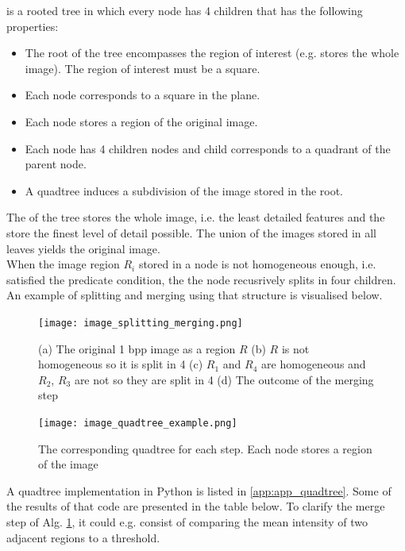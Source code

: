 \documentclass[a4paper]{article}
\begin{document}
 is a rooted tree in which every node has 4 children that has the following properties:
\begin{itemize}
    \item The root of the tree encompasses the region of interest (e.g. stores the whole image). The region of interest must be a square.
    \item Each node corresponds to a square in the plane.
    \item Each node stores a region of the original image.
    \item Each node has 4 children nodes and child corresponds to a quadrant of the parent node.
    \item A quadtree induces a subdivision of the image stored in the root.
\end{itemize}
The  of the tree stores the whole image, i.e. the least detailed features and the  store the finest level of detail possible. The union of the images stored in all leaves yields the original image.\\
When the image region $R_i$ stored in a node is not homogeneous enough, i.e. satisfied the predicate condition, the the node recusrively splits in four children. An example of splitting and merging using that structure is visualised below.

\begin{multicols}{2}
\begin{figure}[H]
    \label{alg:split_merge_high}
	\centering %
	\texttt{[image: image\_splitting\_merging.png]}
    \caption{ (a) The original 1 bpp image as a region $R$ (b) $R$ is not homogeneous so it is split in 4 (c) $R_1$ and $R_4$ are homogeneous and $R_2$, $R_3$ are not so they are split in 4 (d) The outcome of the merging step} 
\end{figure}
\columnbreak
\begin{figure}[H]
	\centering %
	\texttt{[image: image\_quadtree\_example.png]}
    \caption{ The corresponding quadtree for each step. Each node stores a region of the image} 
\end{figure}
\end{multicols}

A quadtree implementation in Python is listed in \ref{app:app_quadtree}. \marginnote{\faCogs \ref{app:app_quadtree} \faCogs} Some of the results of that code are presented in the table below. To clarify the merge step of Alg. \ref{alg:split_merge_high}, it could e.g. consist of comparing the mean intensity of two adjacent regions to a threshold.
\end{document}
